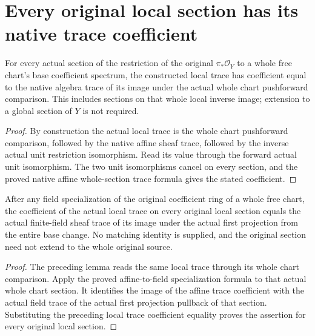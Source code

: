\section{Every original local section has its native trace coefficient}

\begin{lemma}
\label{lem:kn-structure-trace-original-local-value}
\leanok
For every actual section of the restriction of the original
$\pi_*\mathcal O_Y$ to a whole free chart's base coefficient spectrum,
the constructed local trace has coefficient equal to the native algebra
trace of its image under the actual whole chart pushforward comparison.
This includes sections on that whole local inverse image; extension to
a global section of $Y$ is not required.
\end{lemma}
\begin{proof}
By construction the actual local trace is the whole chart pushforward
comparison, followed by the native affine sheaf trace, followed by the
inverse actual unit restriction isomorphism. Read its value through
the forward actual unit isomorphism. The two unit isomorphisms cancel
on every section, and the proved native affine whole-section trace
formula gives the stated coefficient.
\end{proof}

\begin{lemma}
\label{lem:kn-structure-trace-original-local-field-value}
\leanok
After any field specialization of the original coefficient ring of a
whole free chart, the coefficient of the actual local trace on every
original local section equals the actual finite-field sheaf trace of
its image under the actual first projection from the entire base change.
No matching identity is supplied, and the original section need not
extend to the whole original source.
\end{lemma}
\begin{proof}
The preceding lemma reads the same local trace through its whole chart
comparison. Apply the proved affine-to-field specialization formula to
that actual whole chart section. It identifies the image of the affine
trace coefficient with the actual field trace of the actual first
projection pullback of that section. Substituting the preceding local
trace coefficient equality proves the assertion for every original
local section.
\end{proof}
